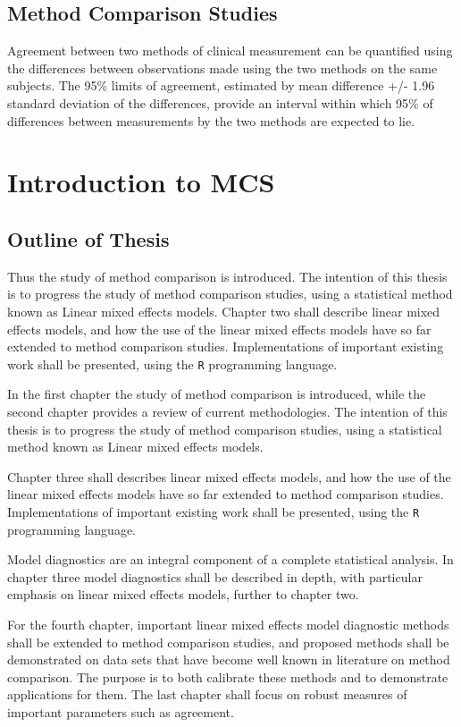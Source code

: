 \documentclass[12pt, a4paper]{report}
\theoremstyle{plain}
\theoremstyle{definition}
\theoremstyle{remark}
\begin{document}
	\section{Method Comparison Studies}
	
	Agreement between two methods of clinical measurement can be quantified using the differences between observations made using the two methods on the same subjects. The 95\% limits of agreement, estimated by mean difference +/- 1.96 standard deviation of the differences, provide an interval within which 95\% of differences between measurements by the two methods are expected to lie.
	
	\chapter{Introduction to MCS}
	\section{Outline of Thesis}
	Thus the study of method comparison is introduced. The intention of this thesis is to progress the
	study of method comparison studies, using a statistical method known as Linear mixed effects models.
	Chapter two shall describe linear mixed effects models, and how the use of the linear mixed
	effects models have so far extended to method comparison studies. Implementations of important existing work shall be presented, using the \texttt{R} programming language.
	
	In the first chapter the study of method comparison is introduced, while the second chapter provides a review of current methodologies. The intention of this thesis is to progress the study of method comparison studies, using a statistical method known as Linear mixed effects models.
	
	Chapter three shall describes linear mixed effects models, and how the use of the linear mixed effects models have so far extended to method comparison studies. Implementations of important existing work shall be presented, using the \texttt{R} programming language.
	
	Model diagnostics are an integral component of a complete statistical analysis.
	In chapter three model diagnostics shall be described in depth, with particular
	emphasis on linear mixed effects models, further to chapter two.
	
	For the fourth chapter, important linear mixed effects model diagnostic methods shall be extended to method comparison studies, and proposed methods shall be demonstrated on data sets that have become well known in literature on method comparison. The purpose is to both calibrate these methods and to demonstrate applications for them.
	The last chapter shall focus on robust measures of important parameters such as agreement.
	
\end{document}
